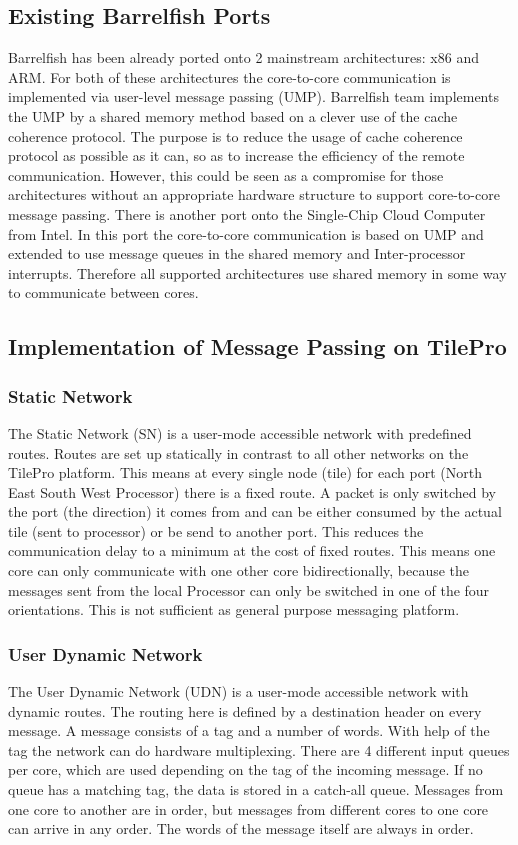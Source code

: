 \documentclass[a4paper,twoside]{report} %
\begin{document}
\subsection{Existing Barrelfish Ports}
Barrelfish has been already ported onto 2 mainstream architectures: x86 and ARM. For
both of these architectures the core-to-core communication is implemented via user-level message passing (UMP). Barrelfish team implements the UMP by a shared memory method based on a clever use of the cache coherence protocol. The purpose is to reduce the usage of cache coherence protocol as possible as it can, so as to increase the efficiency of the remote communication. However, this could be seen as a compromise for those architectures without an appropriate hardware structure to support core-to-core message passing. There is another port onto the Single-Chip Cloud Computer from Intel. In this port the core-to-core communication is based on UMP and extended to use message queues in the shared memory and Inter-processor interrupts. Therefore all supported architectures use shared memory in some way to communicate between cores.

\subsection{Implementation of Message Passing on TilePro}

\subsubsection{Static Network}
The Static Network (SN) is a user-mode accessible network with predefined routes. Routes are set up statically in contrast to all other networks on the TilePro platform. This means at every single node (tile) for each port (North East South West Processor) there is a fixed route. A packet is only switched by the port (the direction) it comes from and can be either consumed by the actual tile (sent to processor) or be send to another port. This reduces the communication delay to a minimum at the cost of fixed routes. This means one core can only communicate with one other core bidirectionally, because the messages sent from the local Processor can only be switched in one of the four orientations. This is not sufficient as general purpose messaging platform.

\subsubsection{User Dynamic Network}
The User Dynamic Network (UDN) is a user-mode accessible network with dynamic routes. The routing here is defined by a  destination header on every message. A message consists of a tag and a number of words. With help of the tag the network can do hardware multiplexing. There are 4 different input queues per core, which are used depending on the tag of the incoming message. If no queue has a matching tag, the data is stored in a catch-all queue. Messages from one core to another are in order, but messages from different cores to one core can arrive in any order. The words of the message itself are always in order.
\end{document}
